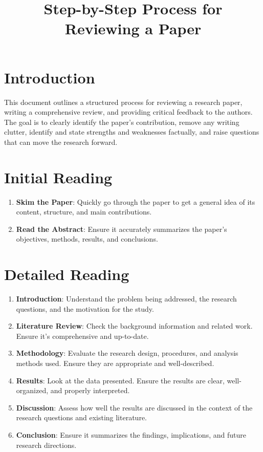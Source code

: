 \documentclass[12pt]{article}
\title{Step-by-Step Process for Reviewing a Paper}
\author{}
\date{}
\begin{document}
\maketitle

\section*{Introduction}
This document outlines a structured process for reviewing a research paper, writing a comprehensive review, and providing critical feedback to the authors. The goal is to clearly identify the paper's contribution, remove any writing clutter, identify and state strengths and weaknesses factually, and raise questions that can move the research forward.

\section{Initial Reading}
\begin{enumerate}
    \item \textbf{Skim the Paper}: Quickly go through the paper to get a general idea of its content, structure, and main contributions.
    \item \textbf{Read the Abstract}: Ensure it accurately summarizes the paper's objectives, methods, results, and conclusions.
\end{enumerate}

\section{Detailed Reading}
\begin{enumerate}
    \item \textbf{Introduction}: Understand the problem being addressed, the research questions, and the motivation for the study.
    \item \textbf{Literature Review}: Check the background information and related work. Ensure it’s comprehensive and up-to-date.
    \item \textbf{Methodology}: Evaluate the research design, procedures, and analysis methods used. Ensure they are appropriate and well-described.
    \item \textbf{Results}: Look at the data presented. Ensure the results are clear, well-organized, and properly interpreted.
    \item \textbf{Discussion}: Assess how well the results are discussed in the context of the research questions and existing literature.
    \item \textbf{Conclusion}: Ensure it summarizes the findings, implications, and future research directions.
\end{enumerate}
\end{document}
